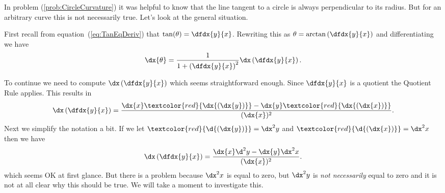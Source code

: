 In problem (\ref{prob:CircleCurvature}) it was helpful to know that the
line tangent to a circle is always perpendicular to its radius. But
for an arbitrary curve this is not necessarily true. Let's look at the
general situation.


First recall from equation~(\ref{eq:TanEqDeriv}) that
$ \tan(\theta) = \dfdx{y}{x}$.  Rewriting this as
$\theta=\arctan\left(\dfdx{y}{x}\right)$ and differentiating we have
\begin{equation}
  \dx{\theta}=\frac{1}{1+\left(\dfdx{y}{x}\right)^2}\dx\left(\dfdx{y}{x}\right).\label{eq:DiffTheta}
\end{equation}

To continue we need to compute $\dx\left(\dfdx{y}{x}\right)$ which
seems straightforward enough. Since $\dfdx{y}{x}$ is a quotient the
Quotient Rule applies. This results in
$$
\dx\left(\dfdx{y}{x}\right) =
\frac{\dx{x}\textcolor{red}{\dx{(\dx{y})}}-\dx{y}\textcolor{red}{\dx{(\dx{x})}}}{(\dx{x})^2}.
$$
Next we simplify the notation a bit. If we let $\textcolor{red}{\d{(\dx{y})}}=\dx^2{y}$ and
$\textcolor{red}{\d{(\dx{x})}}=\dx^2{x}$ then we have
$$
\dx\left(\dfdx{y}{x}\right) =
\frac{\dx{x}\d^2{y}-\dx{y}\dx^2{x}}{(\dx{x})^2}.
$$
which seems OK at first glance. But there is a problem because
$\dx^2x$ is equal to zero, but $\dx^2y$ is \emph{not necessarily}
equal to zero and it is not at all clear why this should be true. We
will take a moment to investigate this.

